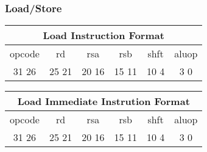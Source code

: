 \documentclass[letterpaper, 11pt]{article}
\begin{document}
\subsubsection{Load/Store}
\begin{center}
		\begin{tabular}{|c|c|c|c|c|c|}
			\multicolumn{6}{c}{Load Instruction Format}\\ \hline
				\hspace{2pt} opcode \hspace{2pt} & \hspace{5pt} rd \hspace{5pt} &  \hspace{4pt} rsa \hspace{4pt} & \hspace{4pt}rsb  \hspace{4pt}& \hspace{10pt}shft  \hspace{10pt} & \hspace{3pt} aluop \hspace{3pt}   \\	\hline
			31 \hfill 26& 25 \hfill 21 &20 \hfill  16& 15 \hfill  11&10 \hfill   4&3 \hfill   0\\ \hline
		
	\end{tabular}
\end{center}
\vspace{0.5cm}
\begin{center}
		\begin{tabular}{|c|c|c|c|c|c|}
				\multicolumn{6}{c}{Load Immediate Instrution Format}\\ \hline
				\hspace{2pt} opcode \hspace{2pt} & \hspace{5pt} rd \hspace{5pt} &  \hspace{4pt} rsa \hspace{4pt} & \hspace{4pt}rsb  \hspace{4pt}& \hspace{10pt}shft  \hspace{10pt} & \hspace{3pt} aluop \hspace{3pt}   \\	\hline
			31 \hfill 26& 25 \hfill 21 &20 \hfill  16& 15 \hfill  11&10 \hfill   4&3 \hfill   0\\ \hline
		
	\end{tabular}
\end{center}
\vspace{0.5cm}
\end{document}
